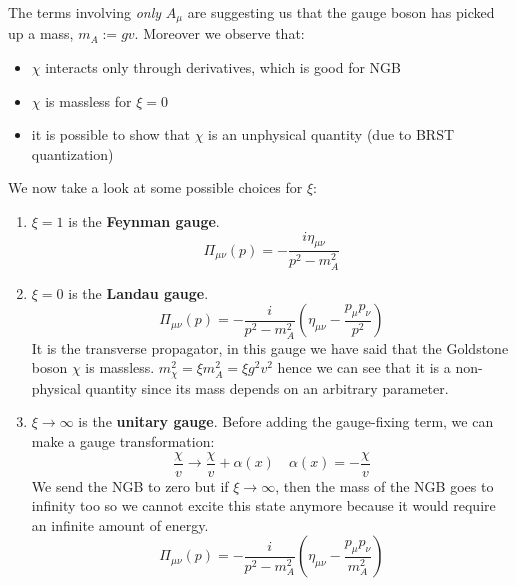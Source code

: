 \documentclass[../main.tex]{subfiles}
\begin{document}
The terms involving \textit{only} $A_\mu$ are suggesting us that the gauge boson has picked up a mass, $m_A:=gv$. Moreover we observe that:
\begin{itemize}
    \item $\chi$ interacts only through derivatives, which is good for NGB 
    \item $\chi$ is massless for $\xi=0$
    \item it is possible to show that $\chi$ is an unphysical quantity (due to BRST quantization)
\end{itemize}
We now take a look at some possible choices for $\xi$:
\begin{enumerate}
    \item $\xi=1$ is the \textbf{Feynman gauge}.
    \[
    \Pi_{\mu\nu}(p)=-\frac{i\eta_{\mu\nu}}{p^2-m_A^2}
    \]
    \item $\xi=0$ is the \textbf{Landau gauge}.
    \[
    \Pi_{\mu\nu}(p)=-\frac{i}{p^2-m_A^2}\left(\eta_{\mu\nu}-\frac{p_\mu p_\nu}{p^2}\right)
    \]
    It is the transverse propagator, in this gauge we have said that the Goldstone boson $\chi$ is massless. $m_\chi^2=\xi m_A^2=\xi g^2v^2$ hence we can see that it is a non-physical quantity since its mass depends on an arbitrary parameter.
    \item $\xi\to\infty$ is the \textbf{unitary gauge}. Before adding the gauge-fixing term, we can make a gauge transformation:
    \[
    \frac{\chi}{v}\to\frac{\chi}{v}+\alpha(x) \quad \alpha(x)=-\frac{\chi}{v} 
    \]
    We send the NGB to zero but if $\xi\to\infty$, then the mass of the NGB goes to infinity too so we cannot excite this state anymore because it would require an infinite amount of energy.
    \[
    \Pi_{\mu\nu}(p)=-\frac{i}{p^2-m_A^2}\left(\eta_{\mu\nu}-\frac{p_\mu p_\nu}{m_A^2}\right)
    \]
\end{enumerate}
\end{document}
